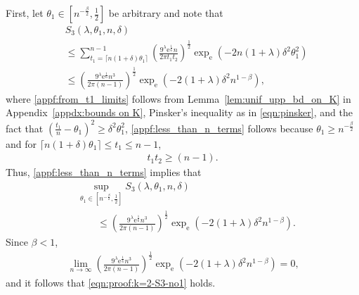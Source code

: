 \documentclass[journal, 10pt]{IEEEtran}
\newcommand{\rme}{\mathrm{e}}
\theoremstyle{plain}
\theoremstyle{plain}
\theoremstyle{plain}
\theoremstyle{plain}
\begin{document}
\begin{appendices}
\begin{IEEEproof}
First, let $\theta_1 \in \left[ n^{-\frac{\beta}{2}}, \frac{1}{2} \right] $ be arbitrary and note that
\begin{align}
&S_3(\lambda, \theta_1, n, \delta)\nonumber \\
&\le 
\sum_{t_1=\lceil n(1+\delta)\theta_1 \rceil }^{n-1} 
\left(\frac{9^\lambda \rme^\frac16 n}{2\pi t_1t_2}\right)^\frac12 \exp_\rme\left({-2n(1+\lambda) \delta^2\theta_1^2}\right) \label{appf:from_t1_limits} \\
&\le
 \left(\frac{9^\lambda \rme^\frac16 n^3}{2\pi(n-1)}\right)^\frac12 \exp_\rme\left(-2(1+\lambda) \delta^2 n^{1-\beta}\right) \text{,} \label{appf:less_than_n_terms}
\end{align}
where \eqref{appf:from_t1_limits} follows from Lemma~\ref{lem:unif_upp_bd_on_K} in Appendix~\ref{appdx:bounds on K}, Pinsker's inequality as in \eqref{eqn:pinsker}, and the fact that $\left( \frac{t_1}{n}-\theta_1 \right)^2 \ge \delta^2 \theta_1^2$, \eqref{appf:less_than_n_terms} follows because $\theta_1 \ge n^{-\frac{\beta}{2}}$ and for $ \lceil n(1+\delta)\theta_1 \rceil \le t_1 \le n-1$, 
\begin{align}
t_1t_2 \ge (n-1)\text{.}
\end{align} 
Thus, \eqref{appf:less_than_n_terms} implies that 
\begin{align}
&\sup_{\theta_1\in \left[ n^{-\frac{\beta}{2}}, \frac{1}{2} \right]} S_3(\lambda, \theta_1, n, \delta) \nonumber \\  
&\qquad \le \left(\frac{9^\lambda \rme^\frac16 n^3}{2\pi(n-1)}\right)^\frac12 \exp_\rme\left(-2(1+\lambda) \delta^2 n^{1-\beta}\right) \text{.} 
\end{align}
Since $\beta <1$, 
\begin{align}
\lim_{n\to \infty}  \left(\frac{9^\lambda \rme^\frac16 n^3}{2\pi(n-1)}\right)^\frac12 \exp_\rme\left(-2(1+\lambda) \delta^2 n^{1-\beta}\right) =0\text{,}
\end{align}
and it follows that \eqref{eqn:proof:k=2-S3-no1} holds.


\end{IEEEproof}
\end{appendices}
\end{document}
